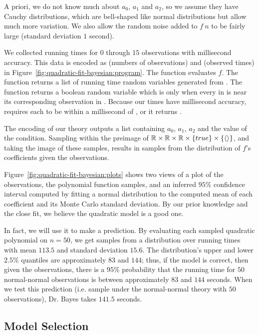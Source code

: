 A priori, we do not know much about $a_0$, $a_1$ and $a_2$, so we assume they have Cauchy distributions, which are bell-shaped like normal distributions but allow much more variation.
We also allow the random noise added to $f~n$ to be fairly large (standard deviation $1$ second).

We collected running times for $0$ through $15$ observations with millisecond accuracy.
This data is encoded as  (numbers of observations) and  (observed times) in Figure~\ref{fig:quadratic-fit-bayesian:program}.
The function  evaluates $f$.
The  function returns a list of running time random variables generated from .
The  function returns a boolean random variable which is  only when every  in  is near its corresponding observation  in .
Because our times have millisecond accuracy,  requires each  to be within a millisecond of , or it returns .

The encoding of our theory outputs a list containing $a_0$, $a_1$, $a_2$ and the value of the condition.
Sampling within the preimage of $\mathbb{R} \times \mathbb{R} \times \mathbb{R} \times \{{true}\} \times \{{\langle{}\rangle}\}$, and taking the image of these samples, results in samples from the distribution of $f$'s coefficients given the observations.

Figure~\ref{fig:quadratic-fit-bayesian:plots} shows two views of a plot of the observations, the polynomial function samples, and an inferred $95\%$ confidence interval computed by fitting a normal distribution to the computed mean of each coefficient and its Monte Carlo standard deviation.
By our prior knowledge and the close fit, we believe the quadratic model is a good one.

In fact, we will use it to make a prediction.
By evaluating each sampled quadratic polynomial on $n = 50$, we get samples from a distribution over running times with mean $113.5$ and standard deviation $15.6$.
The distribution's upper and lower $2.5\%$ quantiles are approximately $83$ and $144$; thus, if the model is correct, then given the observations, there is a $95\%$ probability that the running time for $50$ normal-normal observations is between approximately $83$ and $144$ seconds.
When we test this prediction (i.e. sample under the normal-normal theory with $50$ observations), Dr. Bayes takes $141.5$ seconds.

\subsection{Model Selection}

